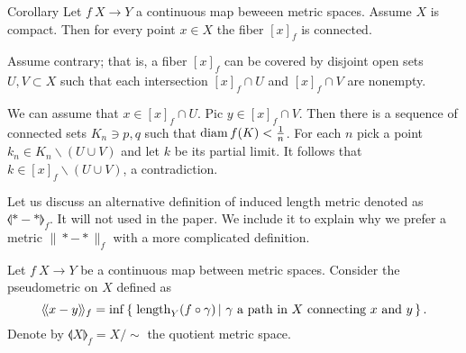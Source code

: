 \documentclass{article}
\begin{document}


\begin{thm}{Corollary}\label{cor:fiberconnected}
Let $f\:X\to Y$ a continuous map beweeen metric spaces.
Assume $X$ is compact. 
Then for every point $x\in X$ the fiber $[x]_f$ is connected.
\end{thm}


Assume contrary;
that is, a fiber $[x]_f$ can be covered by disjoint open sets $U,V\subset X$ such that each intersection 
$[x]_f\cap U$ and $[x]_f\cap V$ are nonempty.

We can assume that $x\in [x]_f\cap U$.
Pic $y\in [x]_f\cap V$.
Then there is a sequence of connected sets $K_n\ni p,q$ such that $\mathop{\rm diam}\nolimits f(K)<\tfrac1n$.
For each $n$ pick a point $k_n\in K_n\backslash (U\cup V)$ and let $k$ be its partial limit.
It follows that $k\in [x]_f\backslash (U\cup V)$, a contradiction.
\qeds



Let us discuss an alternative definition of induced length metric denoted as $\llangle {*}-{*}\rrangle_f$.
It will not used in the paper.
We include it to explain why we prefer a metric $\|{*}-{*}\|_f$ with a more complicated definition.

Let $f\:X\to Y$ be a continuous map between metric spaces. 
Consider the pseudometric on $X$ defined as
\[\llangle x-y\rrangle_f
=
\inf
\set{\length_Y(f\circ\gamma)}{\gamma\ \text{a path in}\  X\ \text{connecting}\ x\ \text{and}\ y}.\]
Denote by $\llangle X\rrangle_f=X/\sim$ the quotient metric space.
\end{document}
